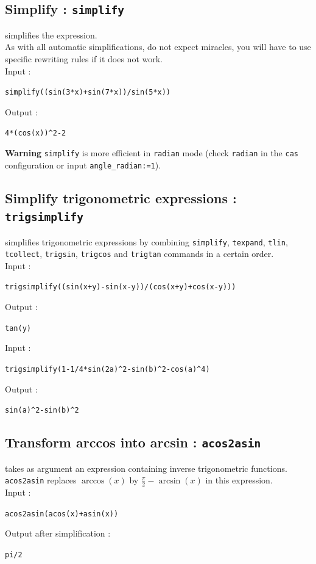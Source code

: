 \documentclass[a4paper,11pt]{book}
\begin{document}
\subsection{Simplify : {\tt simplify}}
 simplifies the expression.\\
As with all automatic simplifications, do not expect miracles,
you will have to use specific rewriting rules if it does not work.\\ 
Input :
\begin{center}{\tt simplify((sin(3*x)+sin(7*x))/sin(5*x))}\end{center}
Output :
\begin{center}{\tt 4*(cos(x))\verb|^|2-2}\end{center}
{\bf Warning} {\tt simplify} is more efficient in {\tt radian} mode (check 
{\tt radian} in the {\tt cas} configuration 
  or  input {\tt angle\_radian:=1}).


\subsection{Simplify trigonometric expressions : {\tt trigsimplify}}
 simplifies trigonometric expressions
by combining {\tt simplify}, {\tt texpand}, {\tt tlin}, {\tt tcollect}, {\tt trigsin}, {\tt trigcos} and {\tt trigtan} commands in a certain order.\\
Input :
\begin{center}{\tt trigsimplify((sin(x+y)-sin(x-y))/(cos(x+y)+cos(x-y)))}\end{center}
Output :
\begin{center}{\tt tan(y)}\end{center}
Input :
\begin{center}{\tt trigsimplify(1-1/4*sin(2a)\verb|^|2-sin(b)\verb|^|2-cos(a)\verb|^|4)}\end{center}
Output :
\begin{center}{\tt sin(a)\verb|^|2-sin(b)\verb|^|2}\end{center}

\subsection{Transform arccos into arcsin : {\tt acos2asin}}
 takes as argument an expression containing 
inverse trigonometric functions.\\
{\tt acos2asin}  replaces $\arccos(x)$ by 
$\displaystyle \frac{\pi}{2}-\arcsin(x)$ in this expression.\\
Input :
\begin{center}{\tt acos2asin(acos(x)+asin(x))}\end{center}
Output after simplification :
\begin{center}{\tt pi/2}\end{center}
\end{document}
